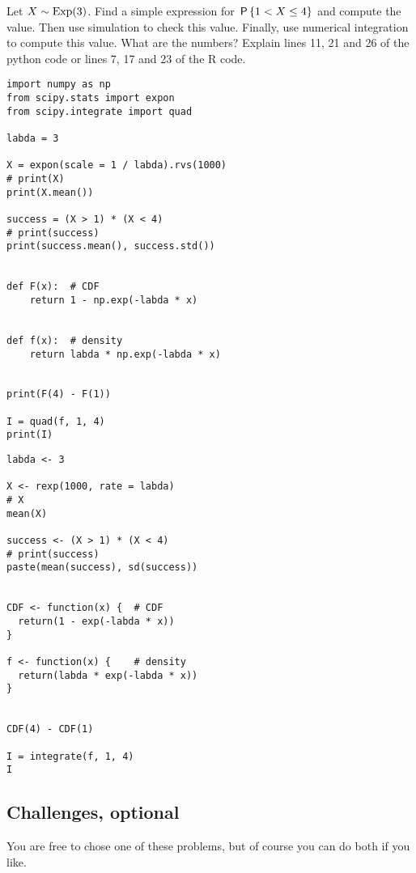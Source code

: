 \documentclass[assignments]{subfiles}
\begin{document}
\begin{exercise}
Let $X\sim\Exp{3}$.
Find a simple expression for $\P{1 < X \leq 4}$ and compute the value.
Then use simulation to check this value.
Finally, use numerical integration to compute this value. What are the numbers? Explain lines 11, 21 and 26 of the python code or lines 7, 17 and 23 of the R code.

\begin{verbatim}
import numpy as np
from scipy.stats import expon
from scipy.integrate import quad

labda = 3

X = expon(scale = 1 / labda).rvs(1000)
# print(X)
print(X.mean())

success = (X > 1) * (X < 4)
# print(success)
print(success.mean(), success.std())


def F(x):  # CDF
    return 1 - np.exp(-labda * x)


def f(x):  # density
    return labda * np.exp(-labda * x)


print(F(4) - F(1))

I = quad(f, 1, 4)
print(I)
\end{verbatim}



\begin{verbatim}
labda <- 3

X <- rexp(1000, rate = labda)
# X
mean(X)

success <- (X > 1) * (X < 4)
# print(success)
paste(mean(success), sd(success))


CDF <- function(x) {  # CDF
  return(1 - exp(-labda * x))
}

f <- function(x) {    # density
  return(labda * exp(-labda * x))
}


CDF(4) - CDF(1)

I = integrate(f, 1, 4)
I
\end{verbatim}


\end{exercise}


\subsection{Challenges, optional}
\label{sec:above-exam-level}

You are free to chose one of these problems, but of course you can do both if you like.
\end{document}
